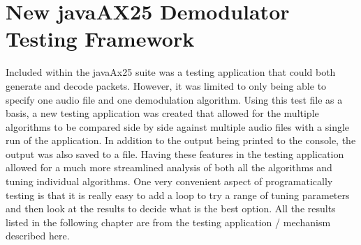 \section{New javaAX25 Demodulator Testing Framework}
Included within the javaAx25 suite was a testing application that could both generate and decode packets. However, it was limited to only being able to specify one audio file and one demodulation algorithm. Using this test file as a basis, a new testing application was created that allowed for the multiple algorithms to be compared side by side against multiple audio files with a single run of the application. In addition to the output being printed to the console, the output was also saved to a file. Having these features in the testing application allowed for a much more streamlined analysis of both all the algorithms and tuning individual algorithms. One very convenient aspect of programatically testing is that it is really easy to add a loop to try a range of tuning parameters and then look at the results to decide what is the best option. All the results listed in the following chapter are from the testing application / mechanism described here.
